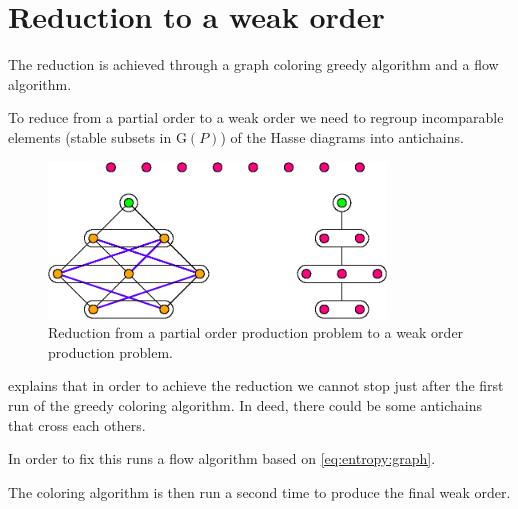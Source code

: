 \section{Reduction to a weak order}
\label{tree:POP:reduction}


The reduction is achieved through a graph coloring greedy algorithm and a flow algorithm.

To reduce from a partial order to a weak order we need to regroup incomparable elements (stable subsets in $\text{G}(P)$) of the Hasse diagrams into antichains.

\begin{figure}
	\centering
	\includegraphics[width=0.8\textwidth]{fig/partial-order-production-reduction:diag}
	\caption{\label{fig:partial-order-production-reduction:diag} Reduction from a partial order production problem to a weak order production problem.}
\end{figure}

\cite{jcardin1} explains that in order to achieve the reduction we cannot stop just after the first run of the greedy coloring algorithm. In deed, there could be some antichains that cross each others.

In order to fix this \cite{jcardin1} runs a flow algorithm based on \ref{eq:entropy:graph}.

The coloring algorithm is then run a second time to produce the final weak order.